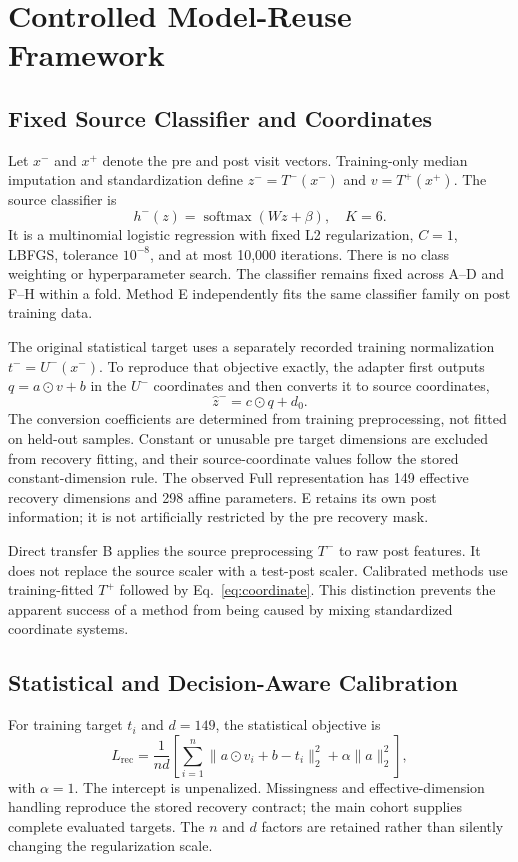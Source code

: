 \section{Controlled Model-Reuse Framework}
\subsection{Fixed Source Classifier and Coordinates}
Let $x^-$ and $x^+$ denote the pre and post visit vectors. Training-only median imputation and standardization define $z^-=T^-(x^-)$ and $v=T^+(x^+)$. The source classifier is
\begin{equation}
 h^-(z)=\operatorname{softmax}(Wz+\beta),\quad K=6.
\end{equation}
It is a multinomial logistic regression with fixed L2 regularization, $C=1$, LBFGS, tolerance $10^{-8}$, and at most 10,000 iterations. There is no class weighting or hyperparameter search. The classifier remains fixed across A--D and F--H within a fold. Method E independently fits the same classifier family on post training data.

The original statistical target uses a separately recorded training normalization $t^-=U^-(x^-)$. To reproduce that objective exactly, the adapter first outputs $q=a\odot v+b$ in the $U^-$ coordinates and then converts it to source coordinates,
\begin{equation}\widehat z^-=c\odot q+d_0.\label{eq:coordinate}\end{equation}
The conversion coefficients are determined from training preprocessing, not fitted on held-out samples. Constant or unusable pre target dimensions are excluded from recovery fitting, and their source-coordinate values follow the stored constant-dimension rule. The observed Full representation has 149 effective recovery dimensions and 298 affine parameters. E retains its own post information; it is not artificially restricted by the pre recovery mask.

Direct transfer B applies the source preprocessing $T^-$ to raw post features. It does not replace the source scaler with a test-post scaler. Calibrated methods use training-fitted $T^+$ followed by Eq.~\eqref{eq:coordinate}. This distinction prevents the apparent success of a method from being caused by mixing standardized coordinate systems.

\subsection{Statistical and Decision-Aware Calibration}
For training target $t_i$ and $d=149$, the statistical objective is
\begin{equation}
 L_{\mathrm{rec}}=\frac{1}{nd}\left[\sum_{i=1}^{n}\|a\odot v_i+b-t_i\|_2^2+\alpha\|a\|_2^2\right],\label{eq:rec}
\end{equation}
with $\alpha=1$. The intercept is unpenalized. Missingness and effective-dimension handling reproduce the stored recovery contract; the main cohort supplies complete evaluated targets. The $n$ and $d$ factors are retained rather than silently changing the regularization scale.

